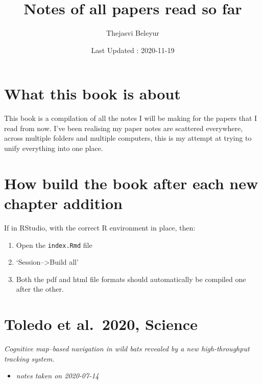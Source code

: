 \documentclass[
]{book}
\title{Notes of all papers read so far}
\author{Thejasvi Beleyur}
\date{Last Updated : 2020-11-19}
\providecommand{\tightlist}{%
  \setlength{\itemsep}{0pt}\setlength{\parskip}{0pt}}
\begin{document}
\maketitle

{
\setcounter{tocdepth}{1}
\tableofcontents
}
\hypertarget{what-this-book-is-about}{%
\chapter*{What this book is about}\label{what-this-book-is-about}}

This book is a compilation of all the notes I will be making for the papers that I read from now.
I've been realising my paper notes are scattered everywhere, across multiple folders and multiple computers,
this is my attempt at trying to unify everything into one place.

\hypertarget{how-build-the-book-after-each-new-chapter-addition}{%
\chapter{How build the book after each new chapter addition}\label{how-build-the-book-after-each-new-chapter-addition}}

If in RStudio, with the correct R environment in place, then:

\begin{enumerate}
\def\labelenumi{\arabic{enumi}.}
\tightlist
\item
  Open the \texttt{index.Rmd} file
\item
  `Session--\textgreater Build all'
\item
  Both the pdf and html file formats should automatically be compiled one after the other.
\end{enumerate}

\hypertarget{toledo-et-al.-2020-science}{%
\chapter{Toledo et al.~2020, Science}\label{toledo-et-al.-2020-science}}


\emph{Cognitive map--based navigation in wild bats revealed by a new high-throughput tracking system.} \citep{toledo2020cognitive}

\begin{itemize}
\tightlist
\item
  \emph{notes taken on 2020-07-14}
\end{itemize}
\end{document}
